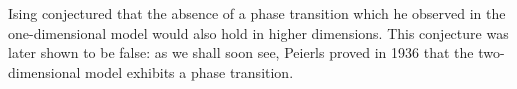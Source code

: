 \begin{remark}
    Ising conjectured that the absence of a phase transition which he observed
    in the one-dimensional model would also hold in higher dimensions.
    This conjecture was later shown to be false:
    as we shall soon see, Peierls proved in 1936 that the two-dimensional model
    exhibits a phase transition.
\end{remark}
